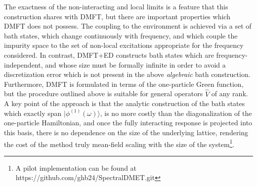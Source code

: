 \documentclass[aps,twocolumn,nobibnotes]{revtex4}
\begin{document}
The exactness of the non-interacting and local limits is a feature that this construction shares with DMFT, but there are important properties which 
DMFT does not possess. The coupling to the environment
is achieved via a set of bath states, which change continuously with frequency, and which couple the impurity space to the set of non-local excitations appropriate for the frequency considered. 
In contrast, DMFT+ED constructs bath states which are
frequency-independent, and whose size must be formally infinite in order to avoid a discretization error which is not present in the above {\em algebraic} bath
construction. Furthermore, DMFT is formulated in terms of the one-particle Green function, but the procedure outlined above is suitable for 
general operators ${\hat V}$ of any rank. 
A key point of the approach is that the analytic construction
of the bath states which exactly span $|\phi^{(1)}(\omega) \rangle$, is no more costly than the diagonalization of the one-particle Hamiltonian, 
and once the fully interacting response is projected into this basis, there is no dependence on the size of the underlying lattice, rendering 
the cost of the method truly mean-field scaling with the size of the system\footnote{A pilot implementation can be found at https://github.com/ghb24/SpectralDMET.git}. 
\end{document}
